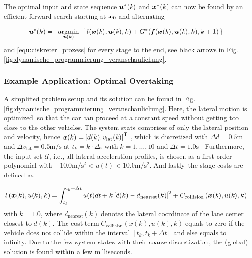 %
The optimal input and state sequence $\boldsymbol{u}^\ast (k)$ and $\boldsymbol{x}^\ast (k)$ can now be found by an efficient forward search starting at $\boldsymbol{x}_0$ and alternating 

\begin{align} \label{equ:navigation_function}
\bs u^\ast(k) = \argmin{\bs u(k)}\{\,l(\bs x(k), \bs u(k), k) + G^\ast(\bs f(\bs x(k), \bs u(k),k), k+1)\,\}
\end{align}
and \eqref{equ:diskreter_prozess} for every stage to the end, see black arrows in  Fig. \ref{fig:dynamische_programmierung_veranschaulichung}.





\subsubsection{Example Application: Optimal Overtaking}\label{S:57.3.3.3}

A simplified problem setup and its solution can be found in Fig. \ref{fig:dynamische_programmierung_veranschaulichung}.
Here, the lateral motion is optimized, so that the car can proceed at a constant speed without getting too close to the other vehicles. 
The system state comprises of only the lateral position and velocity, hence 
$\boldsymbol{x}(k)=\left[d(k),v_\mathrm{lat}(k)\right]^{{\rm T}}$ , which is discretized with $\Delta d=0.5 \mathrm{m}$  and $\Delta v_\mathrm{lat}  =0.5\mathrm{m/s}$  at $t_k=k\cdot \Delta t$ with $k=1,\dots,10$ and $\Delta t=1.0 \mathrm{s}$ . Furthermore, the input set $\mathcal{U}$, i.e., all lateral acceleration profiles, is chosen as a first order polynomial with $-10.0\mathrm{m/s^2} <u(t)< 10.0\mathrm{m/s^2}$. And lastly, the stage costs are defined as

\begin{align*}
l \left(\boldsymbol{x}(k),u(k),k\right) = \int_{t_k}^{t_k+\Delta t}{u(t) dt}+k\left[d(k)-d_\mathrm{nearest}(k)\right]^2 +C_\mathrm{collision}\left(\boldsymbol{x}(k),u(k),k\right)
\end{align*}
with $k=1.0$, where $d_\mathrm{nearest}(k)$ denotes the lateral coordinate of the lane center closest to $d(k)$. 
The cost term $C_\mathrm{collision} \left(x(k),u(k),k\right)$ equals to zero if the vehicle does not collide within the interval $\left[t_k,t_k+\Delta t\right]$ and else equals to infinity. 
Due to the few system states with their coarse discretization, the (global) solution is found within a few milliseconds.

